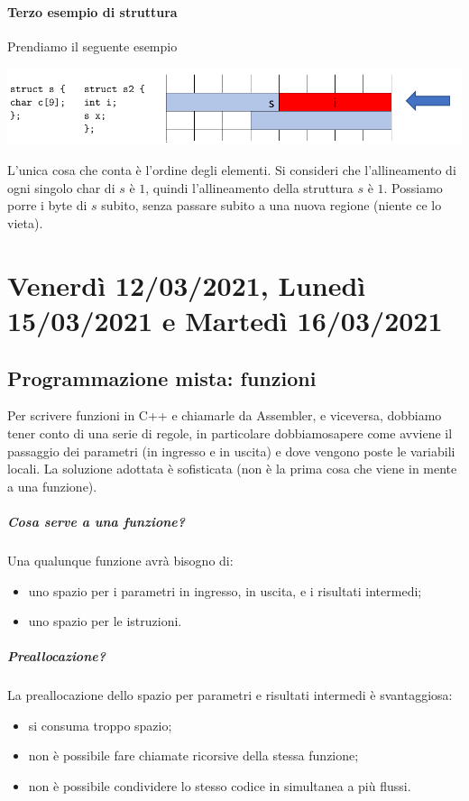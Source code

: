 \documentclass[11pt]{report}
\theoremstyle{definition}
\begin{document}
\subsubsection{Terzo esempio di struttura}
Prendiamo il seguente esempio
\begin{center}
	\includegraphics[scale=0.80]{img/18.PNG}
\end{center} 
L'unica cosa che conta è l'ordine degli elementi. Si consideri che l'allineamento di ogni singolo char di $s$ è $1$, quindi l'allineamento della struttura $s$ è $1$. Possiamo porre i byte di $s$ subito, senza passare subito a una nuova regione (niente ce lo vieta).

\chapter{Venerdì 12/03/2021, Lunedì 15/03/2021 e Martedì 16/03/2021}

\section{Programmazione mista: funzioni}
Per scrivere funzioni in C++ e chiamarle da Assembler, e viceversa, dobbiamo tener conto di una serie di regole, in particolare dobbiamosapere come avviene il passaggio dei parametri (in ingresso e in uscita) e dove vengono poste le variabili locali. La soluzione adottata è sofisticata (non è la prima cosa che viene in mente a una funzione).

\paragraph{Cosa serve a una funzione?}
Una qualunque funzione avrà bisogno di:
\begin{itemize}
\item uno spazio per i parametri in ingresso, in uscita, e i risultati intermedi;
\item uno spazio per le istruzioni.
\end{itemize}
\paragraph{Preallocazione?} La preallocazione dello spazio per parametri e risultati intermedi è svantaggiosa: 
\begin{itemize}
\item si consuma troppo spazio;
\item non è possibile fare chiamate ricorsive della stessa funzione;
\item non è possibile condividere lo stesso codice in simultanea a più flussi.
\end{itemize}
\end{document}
